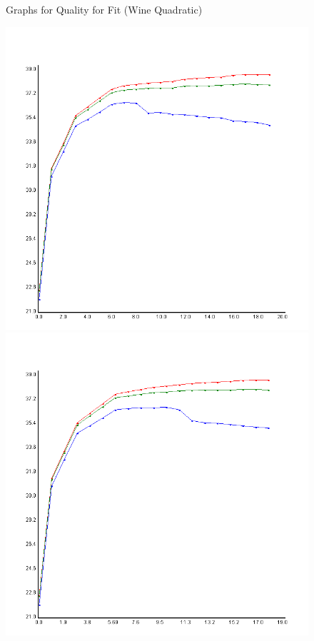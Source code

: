 \documentclass{article}
\begin{document}
	\begin{figure}
	\begin{center}


		\caption \newline Graphs for Quality for Fit (Wine Quadratic)
		
		\includegraphics[scale=0.25]{../plots/Wine/Scala/QuadraticRegressionForwardSel.png}
		\includegraphics[scale=0.25]{../plots/Wine/Scala/QuadraticRegressionBackElim.png}
		

\end{center}
\end{figure}
\end{document}
